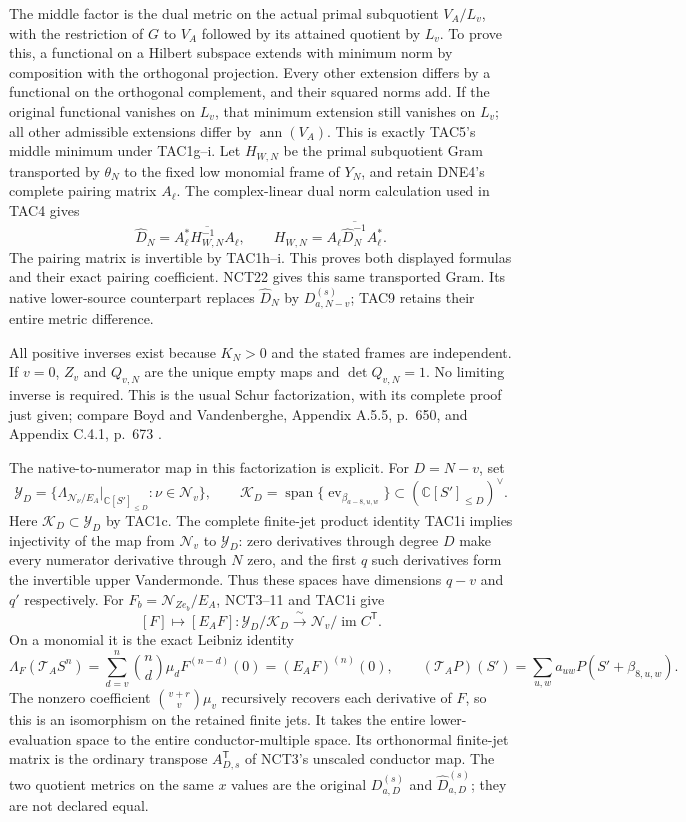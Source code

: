 The middle factor is the dual metric on the actual primal subquotient
$V_A/L_v$, with the restriction of $G$ to $V_A$ followed by its
attained quotient by $L_v$. To prove this, a functional on a Hilbert
subspace extends with minimum norm by composition with the orthogonal
projection. Every other extension differs by a functional on the
orthogonal complement, and their squared norms add. If the original
functional vanishes on $L_v$, that minimum extension still vanishes
on $L_v$; all other admissible extensions differ by
$\operatorname{ann}(V_A)$. This is exactly TAC5's middle minimum
under TAC1g--i. Let $H_{W,N}$ be the primal subquotient Gram transported
by $\theta_N$ to the fixed low monomial frame of $Y_N$, and retain
DNE4's complete pairing matrix $A_\ell$. The complex-linear dual
norm calculation used in TAC4 gives
\[
 \widehat D_N=A_\ell^*\overline{H_{W,N}^{-1}}A_\ell,
 \qquad H_{W,N}=\overline{A_\ell\widehat D_N^{-1}A_\ell^*}.
 \tag{TAC6c}
\]
The pairing matrix is invertible by TAC1h--i. This proves both displayed
formulas and their exact pairing coefficient. NCT22 gives this same
transported Gram. Its native lower-source counterpart replaces
$\widehat D_N$ by $D_{a,N-v}^{(s)}$; TAC9 retains their entire
metric difference.

All positive inverses exist because $K_N>0$ and the stated frames are
independent.  If $v=0$, $Z_v$ and $Q_{v,N}$ are the unique empty maps
and $\det Q_{v,N}=1$.  No limiting inverse is required.
This is the usual Schur factorization, with its complete proof just
given; compare Boyd and Vandenberghe, Appendix A.5.5, p.~650, and
Appendix C.4.1, p.~673 \cite{human:boyd-vandenberghe}.

The native-to-numerator map in this factorization is explicit.
For $D=N-v$, set
\[
 \mathscr Y_D=\{\Lambda_{\mathcal N_\nu/E_A}|_{\mathbb C[S']_{\le D}}
                           :\nu\in\mathscr N_v\},\qquad
 \mathscr K_D=\operatorname{span}\{\operatorname{ev}_{\beta_{a-8,u,w}}\}
                    \subset(\mathbb C[S']_{\le D})^\vee.
\]
Here $\mathscr K_D\subset\mathscr Y_D$ by TAC1c. The complete
finite-jet product identity TAC1i implies injectivity of the map from
$\mathscr N_v$ to $\mathscr Y_D$: zero derivatives through degree
$D$ make every numerator derivative through $N$ zero, and the first
$q$ such derivatives form the invertible upper Vandermonde.
Thus these spaces have dimensions $q-v$ and $q'$ respectively.
For $F_b=\mathcal N_{Ze_b}/E_A$, NCT3--11 and TAC1i give
\[
 [F]\longmapsto[E_AF]:
 \mathscr Y_D/\mathscr K_D
 \xrightarrow{\ \sim\ }
 \mathscr N_v/\operatorname{im}C^{\mathsf T}.
 \tag{TAC7}
\]
On a monomial it is the exact Leibniz identity
\[
 \Lambda_F(\mathcal T_AS^n)
 =\sum_{d=v}^n\binom nd\mu_dF^{(n-d)}(0)
 =(E_AF)^{(n)}(0),\qquad
 (\mathcal T_AP)(S')=\sum_{u,w}a_{uw}P(S'+\beta_{8,u,w}).
\]
The nonzero coefficient $\binom{v+r}{v}\mu_v$ recursively recovers
each derivative of $F$, so this is an isomorphism on the retained finite
jets.  It takes the entire lower-evaluation space to the entire
conductor-multiple space.  Its orthonormal finite-jet matrix is the
ordinary transpose $A_{D,s}^{\mathsf T}$ of NCT3's unscaled conductor
map.  The two quotient metrics on the same $x$ values are the original
$D_{a,D}^{(s)}$ and $\widehat D_{a,D}^{(s)}$; they are not declared equal.

